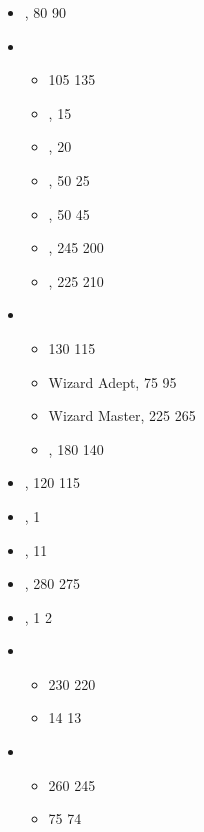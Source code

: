 \begin{multicols}{2}
	\begin{itemize}
		\item \breathofthebrassbull{}, 80 \costup{} 90
		\item \satrap{}
			\begin{itemize}
		\item \basecost{} 105 \costup{} 135
		\item \archerycommander{}, \free{} \costup{} 15
		\item \cavalrycommander{}, 20 \costdown{} \free{}
		\item \shah{}, 50 \costdown{} 25
		\item \mountainwolf{}, 50 \costdown{} 45
		\item \royalgogyag{}, 245 \costdown{} 200
		\item \plainstusker{}, 225 \costdown{} 210
			\end{itemize}
		\item \hobgoblinconjurer{}
			\begin{itemize}
		\item \basecost{} 130 \costdown{} 115
		\item Wizard Adept, 75 \costup{} 95
		\item Wizard Master, 225 \costup{} 265
		\item \plainstusker{}, 180 \costdown{} 140 
			\end{itemize}
		\item \hoblevies{}, \basecost{} 120 \costdown{} 115
		\item \hobauxiliaries{} \disciples{},  1 \costdown{} \free{}
		\item \mountainwolfcavalry{},  \costdown{} 11
		\item \hobcataphracts{}, \basecost{} 280 \costdown{} 275
		\item \hobcataphracts{}, \eternals{}  1 \costup{} 2
		\item \blastedplainemissaries{}
			\begin{itemize}
			\item \basecost{} 230 \costdown{} 220
			\item \extramodel{} 14 \costdown{} 13
			\end{itemize}
		\item \skymountainemissaries{}
			\begin{itemize}
		\item \basecost{} 260 \costdown{} 245
		\item \extramodel{} 75 \costdown{} 74
			\end{itemize}

\end{itemize}
\end{multicols}